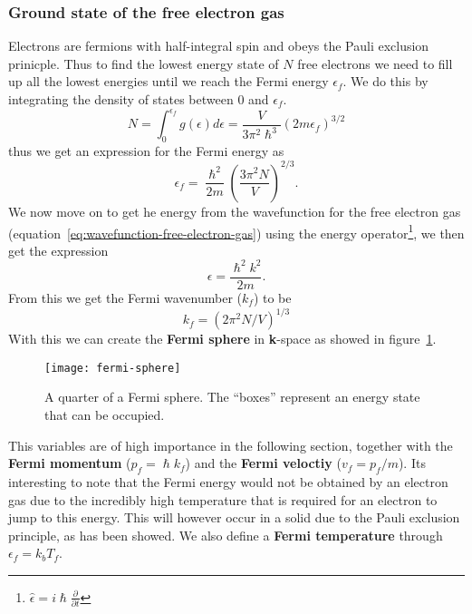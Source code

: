 \documentclass[11pt]{article}
\begin{document}
\subsubsection{Ground state of the free electron gas}
Electrons are fermions with half-integral spin and obeys the Pauli exclusion prinicple. Thus to find the lowest energy state of $N$ free electrons we need to fill up all the lowest energies until we reach the Fermi energy $\epsilon_f$. We do this by integrating the density of states between $0$ and $\epsilon_f$.  
\begin{equation}
	N = \int_0^{\epsilon_f} g(\epsilon) d\epsilon = \frac{V}{3 \pi^2 \hslash^3} (2m\epsilon_f)^{3/2}
\end{equation}
thus we get an expression for the Fermi energy as
\begin{equation}
	\epsilon_f = \frac{\hslash^2}{2m} (\frac{3 \pi^2 N}{V})^{2/3}.
\end{equation}
We now move on to get he energy from the wavefunction for the free electron gas (equation~\ref{eq:wavefunction-free-electron-gas}) using the energy operator\footnote{$\hat{\epsilon} = i \hslash \frac{\partial}{\partial t}$}, we then get the expression
\begin{equation}
	\epsilon = \frac{\hslash^2 k^2}{2m}.
\end{equation}
From this we get the Fermi wavenumber ($k_f$) to be
\begin{equation}
	k_f = (2 \pi^2N/V)^{1/3}
\end{equation}
With this we can create the \textbf{Fermi sphere} in \textbf{k}-space as showed in figure~\ref{fig:fermi-sphere}. 
\begin{figure}[!ht]
	\centering
	\texttt{[image: fermi-sphere]}
	\caption{A quarter of a Fermi sphere. The ``boxes'' represent an energy state that can be occupied. }
	\label{fig:fermi-sphere}
\end{figure}
This variables are of high importance in the following  section, together with the \textbf{Fermi momentum} ($p_f = \hslash k_f$) and the \textbf{Fermi veloctiy} ($v_f = p_f/m$). Its interesting to note that the Fermi energy would not be obtained by an electron gas due to the incredibly high temperature that is required for an electron to jump to this energy. This will however occur in a solid due to the Pauli exclusion principle, as has been showed. We also define a \textbf{Fermi temperature} through $\epsilon_f = k_b T_f$.
\end{document}

